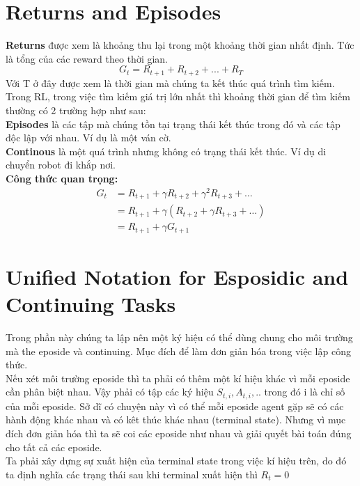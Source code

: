 \documentclass[12pt,a4paper]{article}
\begin{document}
\section{Returns and Episodes}
\textbf{Returns} được xem là khoảng thu lại trong một khoảng thời gian nhất định. Tức là tổng của các reward theo thời gian.
\[G_t = R_{t+1} + R_{t+2} + ... + R_T\]
Với T ở đây được xem là thời gian mà chúng ta kết thúc quá trình tìm kiếm.\\
Trong RL, trong việc tìm kiếm giá trị lớn nhất thì khoảng thời gian để tìm kiếm thường có 2 trường hợp như sau:\\
\textbf{Episodes} là các tập mà chúng tồn tại trạng thái kết thúc trong đó và các tập độc lập với nhau. Ví dụ là một ván cờ.\\
\textbf{Continous} là một quá trình nhưng không có trạng thái kết thúc. Ví dụ di chuyển robot đi khắp nơi.\\
\textbf{Công thức quan trọng:}
\begin{align*}
G_t &= R_{t+1} + \gamma R_{t+2} + \gamma^2 R_{t+3} + \dots\\
&= R_{t+1} + \gamma (R_{t+2} + \gamma R_{t+3} + \dots)\\
&= R_{t+1} + \gamma G_{t+1}
\end{align*}
\section{Unified Notation for Esposidic and Continuing Tasks}
Trong phần này chúng ta lập nên một ký hiệu có thể dùng chung cho môi trường mà the eposide và continuing. Mục đích để làm đơn giản hóa trong việc lập công thức.\\ 
Nếu xét môi trường eposide thì ta phải có thêm một kí hiệu khác vì mỗi eposide cần phân biệt nhau. Vậy phải có tập các ký hiệu $S_{t,i}, A_{t,i},..$ trong đó i là chỉ số của mỗi eposide. Sở dĩ có chuyện này vì có thể mỗi eposide agent gặp sẽ có các hành động khác nhau và có kêt thúc khác nhau (terminal state). Nhưng vì mục đích đơn giản hóa thì ta sẽ coi các eposide như nhau và giải quyết bài toán đúng cho tất cả các eposide. \\
Ta phải xây dựng sự xuất hiện của terminal state trong việc kí hiệu trên, do đó ta định nghĩa các trạng thái sau khi terminal xuất hiện thì $R_t = 0$
\end{document}
